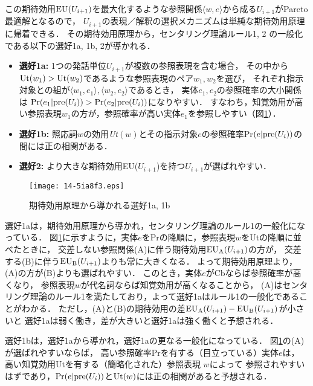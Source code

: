 \documentclass[japanese]{jnlp_1.3e}
\begin{document}
この期待効用${\rm EU}(U_{i+1})$を最大化するような参照関係$\langle w, e \rangle$から成る$U_{i+1}$がPareto最適解となるので，
$U_{i+1}$の表現／解釈の選択メカニズムは単純な期待効用原理に帰着できる．
その期待効用原理から，センタリング理論ルール1, 2 の一般化である以下の選好1a, 1b, 2が導かれる．
\begin{itemize}
\item {\bf 選好1a:} 1つの発話単位$U_{i+1}$が複数の参照表現を含む場合，
その中から${\rm Ut}(w_1)>{\rm Ut}(w_2)$であるような参照表現のペア$w_1, w_2$を選び，
それぞれ指示対象との組が$\langle w_1, e_1 \rangle, \langle w_2, e_2 \rangle$であるとき，
実体$e_1, e_2$の参照確率の大小関係は
${\rm Pr}(e_1|{\rm pre}(U_i))>{\rm Pr}(e_2|{\rm pre}(U_i))$になりやすい．
すなわち，知覚効用が高い参照表現$w_1$の方が，参照確率が高い実体$e_1$を参照しやすい（図\ref{fig:crossed_or_uncrossed}）．
\item {\bf 選好1b:} 照応詞$w$の効用{\it Ut$(w)$}とその指示対象$e$の参照確率Pr$(e|{\rm pre}(U_i))$の間には正の相関がある．
\item {\bf 選好2: } より大きな期待効用EU($U_{i+1}$)を持つ$U_{i+1}$が選ばれやすい．
\end{itemize}

\begin{figure}[b]
\begin{center}
      \texttt{[image: 14-5ia8f3.eps]}
  \caption{期待効用原理から導かれる選好1a, 1b}
  \label{fig:crossed_or_uncrossed}
 \end{center}
\vspace{-\normalbaselineskip}
\end{figure}



選好1aは，期待効用原理から導かれ，センタリング理論のルール1の一般化になっている．
図\ref{fig:crossed_or_uncrossed}に示すように，実体$e$をPrの降順に，参照表現$w$をUtの降順に並べたときに，
交差しない参照関係(A)に伴う期待効用${\rm EU_A}(U_{i+1})$の方が，
交差する(B)に伴う${\rm EU_B}(U_{i+1})$よりも常に大きくなる．
よって期待効用原理より，(A)の方が(B)よりも選ばれやすい．
このとき，実体$e$がCbならば参照確率が高くなり，
参照表現$w$が代名詞ならば知覚効用が高くなることから，
(A)はセンタリング理論のルール1を満たしており，よって選好1aはルール1の一般化であることがわかる．
ただし，(A)と(B)の期待効用の差${\rm EU_A}(U_{i+1})-{\rm EU_B}(U_{i+1})$が小さいと
選好1aは弱く働き，差が大きいと選好1aは強く働くと予想される．

選好1bは，選好1aから導かれ，選好1aの更なる一般化になっている．
図\ref{fig:crossed_or_uncrossed}の(A)が選ばれやすいならば，
高い参照確率Prを有する（目立っている）実体$e$は，
高い知覚効用Utを有する（簡略化された）参照表現 $w$によって
参照されやすいはずであり，${\rm Pr}(e|{\rm pre}(U_i))$と${\rm Ut}(w)$には正の相関があると予想される．
\end{document}
